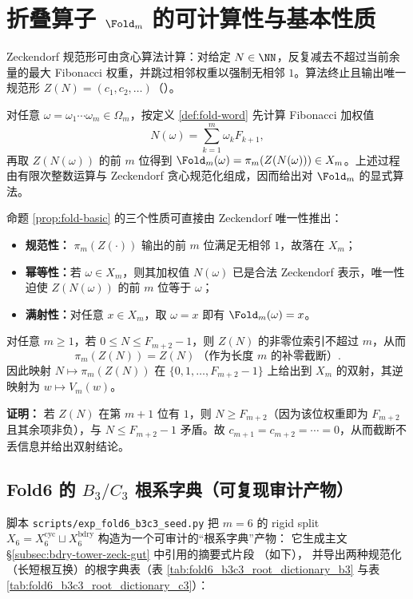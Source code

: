 \section{折叠算子 \texorpdfstring{$\Fold_m$}{Fold\_m} 的可计算性与基本性质}

Zeckendorf 规范形可由贪心算法计算：对给定 $N\in\NN$，反复减去不超过当前余量的最大 Fibonacci 权重，并跳过相邻权重以强制无相邻 $1$。算法终止且输出唯一规范形 $Z(N)=(c_1,c_2,\dots)$（\cite{Zeckendorf1972}）。

对任意 $\omega=\omega_1\cdots\omega_m\in\Omega_m$，按定义 \ref{def:fold-word} 先计算 Fibonacci 加权值
\[
N(\omega)=\sum_{k=1}^m \omega_k F_{k+1},
\]
再取 $Z(N(\omega))$ 的前 $m$ 位得到 $\Fold_m(\omega)=\pi_m(Z(N(\omega)))\in X_m$。上述过程由有限次整数运算与 Zeckendorf 贪心规范化组成，因而给出对 $\Fold_m$ 的显式算法。

命题 \ref{prop:fold-basic} 的三个性质可直接由 Zeckendorf 唯一性推出：
\begin{itemize}
  \item \textbf{规范性：} $\pi_m(Z(\cdot))$ 输出的前 $m$ 位满足无相邻 $1$，故落在 $X_m$；
  \item \textbf{幂等性：}若 $\omega\in X_m$，则其加权值 $N(\omega)$ 已是合法 Zeckendorf 表示，唯一性迫使 $Z(N(\omega))$ 的前 $m$ 位等于 $\omega$；
  \item \textbf{满射性：}对任意 $x\in X_m$，取 $\omega=x$ 即有 $\Fold_m(\omega)=x$。
\end{itemize}

\begin{lemma}\label{lem:zeckendorf-range-bijection}
对任意 $m\ge 1$，若 $0\le N\le F_{m+2}-1$，则 $Z(N)$ 的非零位索引不超过 $m$，从而
\[
\pi_m(Z(N))=Z(N)\ \text{（作为长度 }m\text{ 的补零截断）}.
\]
因此映射 $N\mapsto \pi_m(Z(N))$ 在 $\{0,1,\dots,F_{m+2}-1\}$ 上给出到 $X_m$ 的双射，其逆映射为 $w\mapsto V_m(w)$。
\end{lemma}

\textbf{证明：}
若 $Z(N)$ 在第 $m+1$ 位有 $1$，则 $N\ge F_{m+2}$（因为该位权重即为 $F_{m+2}$ 且其余项非负），与 $N\le F_{m+2}-1$ 矛盾。故 $c_{m+1}=c_{m+2}=\cdots=0$，从而截断不丢信息并给出双射结论。

\subsection{Fold6 的 \texorpdfstring{$B_3/C_3$}{B3/C3} 根系字典（可复现审计产物）}
\label{app:fold6-b3c3-seed-dictionary}

脚本 \texttt{scripts/exp\_fold6\_b3c3\_seed.py} 把 \(m=6\) 的 rigid split
\(
X_6=X_6^{\mathrm{cyc}}\sqcup X_6^{\mathrm{bdry}}
\)
构造为一个可审计的“根系字典”产物：
它生成主文 \S\ref{subsec:bdry-tower-zeck-gut} 中引用的摘要式片段
\verb||（如下），
并导出两种规范化（长短根互换）的根字典表（表 \ref{tab:fold6_b3c3_root_dictionary_b3} 与表 \ref{tab:fold6_b3c3_root_dictionary_c3}）：

